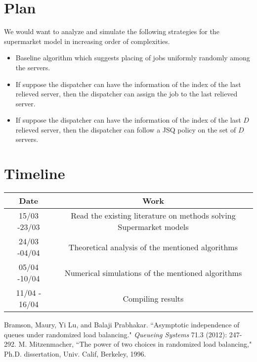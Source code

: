 \documentclass[a4paper,english,11pt]{article}
\begin{document}
\section{Plan}
We would want to analyze and simulate the following strategies for the supermarket model in increasing order of complexities.
\begin{itemize}
\item Baseline algorithm which suggests placing of jobs uniformly randomly among the servers.
\item If suppose the dispatcher can have the information of the index of the last relieved server, then the dispatcher can assign the job to the last relieved server.
\item If suppose the dispatcher can have the information of the index of the last $D$ relieved server, then the dispatcher can follow a JSQ policy on the set of $D$ servers.     
\end{itemize} 
\section{Timeline}
\begin{center}
\begin{tabular}{|c|c|}
\hline
Date & Work \\ \hline
15/03 -23/03 & Read the existing literature on methods solving Supermarket models \cite{Balaji} \cite{Mitzenmacher}  \\ \hline
24/03 -04/04 & Theoretical analysis of the mentioned algorithms \\ \hline
05/04 -10/04 & Numerical simulations of the mentioned algorithms \\ \hline
11/04 - 16/04 & Compiling results \\ \hline
\end{tabular}
\end{center}

\begin{thebibliography}{10}
Bramson, Maury, Yi Lu, and Balaji Prabhakar. ``Asymptotic independence of queues under randomized load balancing." \textit{Queueing Systems} 71.3 (2012): 247-292.
M. Mitzenmacher, ``The power of two choices in randomized load balancing," Ph.D. dissertation, Univ. Calif, Berkeley, 1996.
\end{thebibliography}
\end{document}
